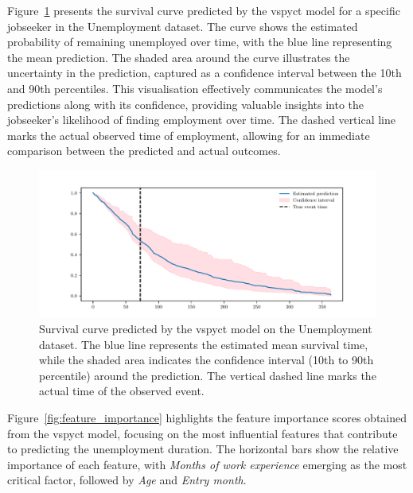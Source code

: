 \documentclass[3p,review,authoryear]{elsarticle}
\begin{document}
Figure~\ref{fig:pred_ci} presents the survival curve predicted by the \gls{vspyct} model for a specific jobseeker in the Unemployment dataset.
The curve shows the estimated probability of remaining unemployed over time, with the blue line representing the mean prediction.
The shaded area around the curve illustrates the uncertainty in the prediction, captured as a confidence interval between the 10th and 90th percentiles.
This visualisation effectively communicates the model's predictions along with its confidence, providing valuable insights into the jobseeker's likelihood of finding employment over time.
The dashed vertical line marks the actual observed time of employment, allowing for an immediate comparison between the predicted and actual outcomes.

\begin{figure}[h!]
    \centering
    \includegraphics[width=1.0\textwidth]{pred_with_ci.pdf}
    \caption{Survival curve predicted by the \gls{vspyct} model on the Unemployment dataset. The blue line represents the estimated mean survival time, while the shaded area indicates the confidence interval (10th to 90th percentile) around the prediction. The vertical dashed line marks the actual time of the observed event.}
    \label{fig:pred_ci}
\end{figure}

Figure~\ref{fig:feature_importance} highlights the feature importance scores obtained from the \gls{vspyct} model, focusing on the most influential features that contribute to predicting the unemployment duration.
The horizontal bars show the relative importance of each feature, with \textit{Months of work experience} emerging as the most critical factor, followed by \textit{Age} and \textit{Entry month}.
\end{document}
